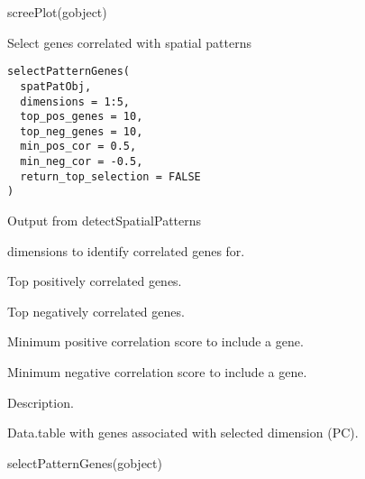 \documentclass[a4paper]{book}
\begin{document}
%
\begin{Examples}
\begin{ExampleCode}
    screePlot(gobject)
\end{ExampleCode}
\end{Examples}
%
\begin{Description}\relax
Select genes correlated with spatial patterns
\end{Description}
%
\begin{Usage}
\begin{verbatim}
selectPatternGenes(
  spatPatObj,
  dimensions = 1:5,
  top_pos_genes = 10,
  top_neg_genes = 10,
  min_pos_cor = 0.5,
  min_neg_cor = -0.5,
  return_top_selection = FALSE
)
\end{verbatim}
\end{Usage}
%
\begin{Arguments}
\begin{ldescription}
\item[\code{spatPatObj}] Output from detectSpatialPatterns

\item[\code{dimensions}] dimensions to identify correlated genes for.

\item[\code{top\_pos\_genes}] Top positively correlated genes.

\item[\code{top\_neg\_genes}] Top negatively correlated genes.

\item[\code{min\_pos\_cor}] Minimum positive correlation score to include a gene.

\item[\code{min\_neg\_cor}] Minimum negative correlation score to include a gene.
\end{ldescription}
\end{Arguments}
%
\begin{Details}\relax
Description.
\end{Details}
%
\begin{Value}
Data.table with genes associated with selected dimension (PC).
\end{Value}
%
\begin{Examples}
\begin{ExampleCode}
    selectPatternGenes(gobject)
\end{ExampleCode}
\end{Examples}
\end{document}
